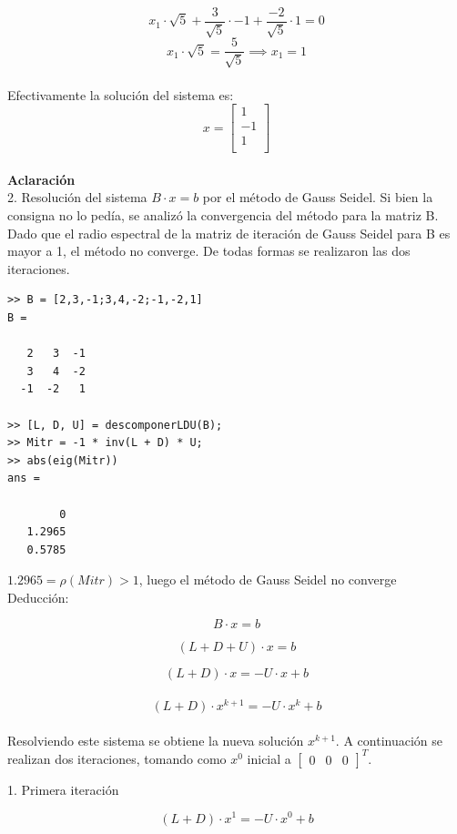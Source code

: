 \documentclass{article}
\begin{document}
\[
x_1 \cdot \sqrt{5} + \dfrac{3}{\sqrt{5}} \cdot -1 + \dfrac{-2}{\sqrt{5}} \cdot 1 = 0
\]
\[
x_1 \cdot \sqrt{5} = \dfrac{5}{\sqrt{5}} \implies x_1 = 1
\]\\

Efectivamente la solución del sistema es:
\[
    x =
    \begin{bmatrix}
    1 \\
    -1 \\
    1 \\
    \end{bmatrix}
\]\\
\textbf{Aclaración}\\
2. Resolución del sistema $B \cdot x = b$ por el método de Gauss Seidel. Si bien la consigna no lo pedía, se analizó la convergencia del método para la matriz B. Dado que el radio espectral de la matriz de iteración de Gauss Seidel para B es mayor a 1, el método no converge. De todas formas se realizaron las dos iteraciones.

\begin{lstlisting}
>> B = [2,3,-1;3,4,-2;-1,-2,1]
B =

   2   3  -1
   3   4  -2
  -1  -2   1

>> [L, D, U] = descomponerLDU(B);
>> Mitr = -1 * inv(L + D) * U;
>> abs(eig(Mitr))
ans =

        0
   1.2965
   0.5785

\end{lstlisting}
$1.2965 = \rho(Mitr) > 1$, luego el método de Gauss Seidel no converge\\

Deducción:

\[
B \cdot x = b
\]

\[
(L + D + U) \cdot x = b
\]

\[
(L + D) \cdot x = -U \cdot x + b
\] \\

\[
(L + D) \cdot x^{k+1} = -U \cdot x^k + b
\] \\

Resolviendo este sistema se obtiene la nueva solución $x^{k+1}$. A continuación se realizan dos iteraciones, tomando como $x^0$ inicial a $\begin{bmatrix}
    0 & 0 & 0
\end{bmatrix}^T$.

1. Primera iteración

\[
(L + D) \cdot x^{1} = -U \cdot x^0 + b
\] 
\end{document}
